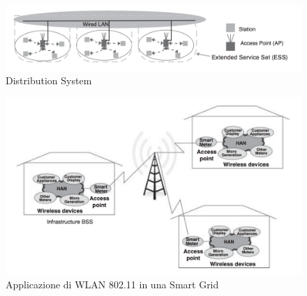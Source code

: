 \vspace{30pt}
\begin{figure}[h]
	\centering
	\includegraphics[scale=0.450]{imgs/ds.png}
	\caption{Distribution System} \label{fig:ds}
\end{figure}
\begin{figure}[h]
	\centering
	\includegraphics[scale=0.350]{imgs/80211smartgrid.png}
	\caption{Applicazione di WLAN 802.11 in una Smart Grid} \label{fig:802_sg}
\end{figure}\newpage
